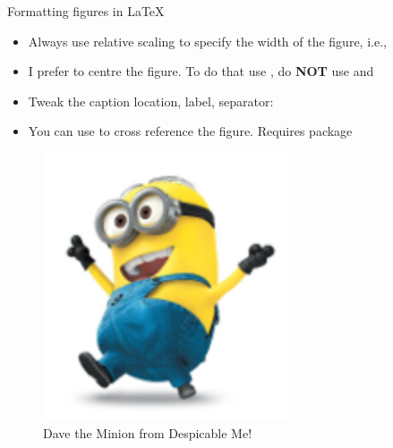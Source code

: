 \documentclass[10pt,times]{beamer}
\begin{document}
\begin{frame}[fragile]{Formatting figures in \LaTeX}
\begin{itemize}

\item Always use relative scaling to specify the width of the figure, i.e., 

\cmmd{[width = 0.75\bs textwidth]}

\item I prefer to centre the figure. To do that use , do 
\textbf{NOT} use  and 

\item Tweak the caption location, label, separator: 

\item You can use  to cross reference the 
figure. Requires package 

\end{itemize}
\begin{exampletwoup}
\begin{figure}
\centering
\includegraphics[width=0.65\textwidth]
                           {figs/minion}
\caption[Minion]{
Dave the Minion from Despicable Me!}
\label{fig:minion} %
\end{figure}
\end{exampletwoup}
\end{frame}
\end{document}
